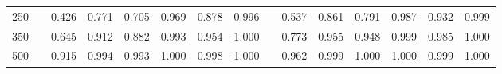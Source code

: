 % 
\begin{tabular}{ccccccccccccccc}
  \hline
  \hline
250 &  & 0.426 & 0.771 & 0.705 & 0.969 & 0.878 & 0.996 &  & 0.537 & 0.861 & 0.791 & 0.987 & 0.932 & 0.999 \\ 
  350 &  & 0.645 & 0.912 & 0.882 & 0.993 & 0.954 & 1.000 &  & 0.773 & 0.955 & 0.948 & 0.999 & 0.985 & 1.000 \\ 
  500 &  & 0.915 & 0.994 & 0.993 & 1.000 & 0.998 & 1.000 &  & 0.962 & 0.999 & 1.000 & 1.000 & 0.999 & 1.000 \\ 
   \hline
\end{tabular}
